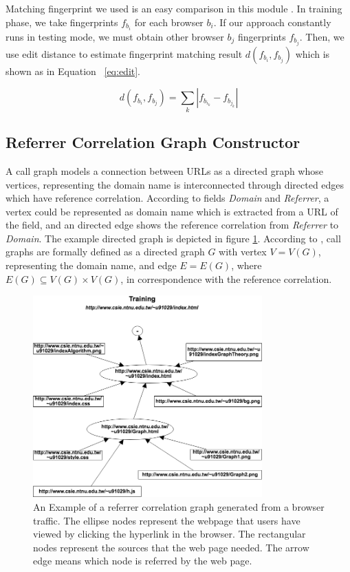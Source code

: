 Matching fingerprint we used is an easy comparison in this module \cite{bortolameotti2017decanter}. In training phase, we take fingerprints $f_{b_{i}}$ for each browser $b_{i}$. If our approach constantly runs in testing mode, we must obtain other browser $b_{j}$ fingerprints $f_{b_{j}}$. Then, we use edit distance to estimate fingerprint matching result $d(f_{b_{i}}, f_{b_{j}}) $ which is shown as in Equation ~\ref{eq:edit}.

\begin{equation}
        \label{eq:edit}
        d(f_{b_{i}}, f_{b_{j}}) = \sum_k \left |  f_{b_{i_{k}}} - f_{b_{j_{k}}} \right |  
\end{equation}

\subsection{Referrer Correlation Graph Constructor}

A call graph models a connection between URLs as a directed graph whose vertices, representing the domain name is interconnected through directed edges which have reference correlation. According to fields {\em Domain} and {\em Referrer}, a vertex could be represented as domain name which is extracted from a URL of the field, and an directed edge shows the reference correlation from {\em Referrer} to {\em Domain}. The example directed graph is depicted in figure \ref{fig:ref_graph}. According to \cite{kinable2011malware}, call graphs are formally defined as a directed graph $G$ with vertex $V = V(G)$, representing the domain name, and edge $E = E(G)$, where $E(G) \subseteq V(G) \times V(G) $, in correspondence with the reference correlation.

\begin{figure}[!t]
\centering
\includegraphics[width=250pt]{image/ref_graph.png}
\caption{An Example of a referrer correlation graph generated from a browser traffic. The ellipse nodes represent the webpage that users have viewed by clicking the hyperlink in the browser. The rectangular nodes represent the sources that the web page needed. The arrow edge means which node is referred by the web page.}
\label{fig:ref_graph}
\end{figure}

